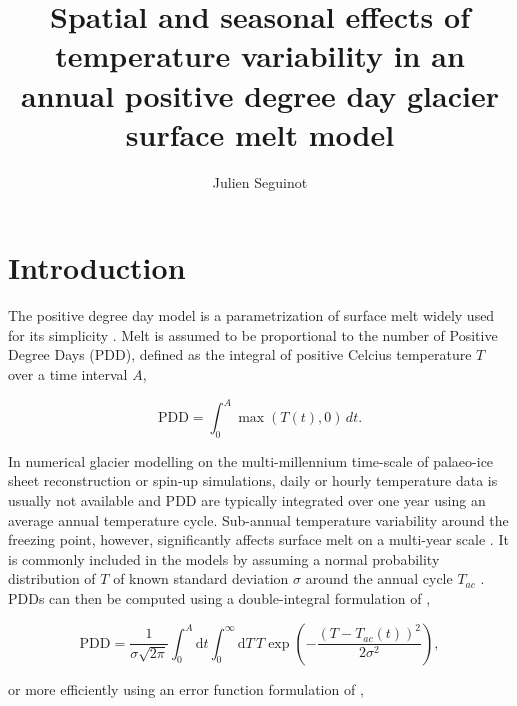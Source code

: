 \documentclass[review]{igs}
\begin{document}
\title[Temperature variability in a positive degree day model]{Spatial and seasonal effects of temperature variability in an annual positive degree day glacier surface melt model}
\author[J. Seguinot]{Julien Seguinot}

\maketitle


\section{Introduction}

The positive degree day model is a parametrization of surface melt widely used for its simplicity \citep{hock-2003}. Melt is assumed to be proportional to the number of Positive Degree Days (PDD), defined as the integral of positive Celcius temperature $T$ over a time interval $A$,

\begin{equation} \label{eq:pdd}
  \mathrm{PDD} = \int_{0}^{A}\max(T(t),0)\,dt.
\end{equation}

In numerical glacier modelling on the multi-millennium time-scale of palaeo-ice sheet reconstruction or spin-up simulations, daily or hourly temperature data is usually not available and PDD are typically integrated over one year using an average annual temperature cycle. Sub-annual temperature variability around the freezing point, however, significantly affects surface melt on a multi-year scale \citep{arnold-mackay-1964}. It is commonly included in the models by assuming a normal probability distribution of $T$ of known standard deviation $\sigma$ around the annual cycle $T_{ac}$ \citep{braithwaite-1984}. PDDs can then be computed using a double-integral formulation of \citet{reeh-1991},

\begin{equation} \label{eq:reeh}
  \mathrm{PDD} = \frac{1}{\sigma\sqrt{2\pi}}
    \int_{0}^{A} \mathrm{d}t
    \int_{0}^{\infty} \mathrm{d}T \,
    T \exp\left({-\frac{(T-T_{ac}(t))^2}{2\sigma^2}}\right),
\end{equation}

or more efficiently using an error function formulation of \citet{calov-greve-2005},
\end{document}
